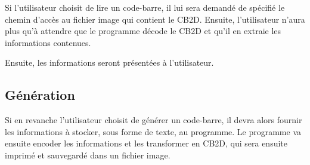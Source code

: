 Si l'utilisateur choisit de lire un code-barre, il lui sera demandé de spécifié le chemin d'accès au fichier image qui contient le CB2D. Ensuite, l'utilisateur n'aura plus qu'à attendre que le programme décode le CB2D et qu'il en extraie les informations contenues.

Ensuite, les informations seront présentées à l'utilisateur.

\subsection{Génération}

Si en revanche l'utilisateur choisit de générer un code-barre, il devra alors fournir les informations à stocker, sous forme de texte, au programme. Le programme va ensuite encoder les informations et les transformer en CB2D, qui sera ensuite imprimé et sauvegardé dans un fichier image.